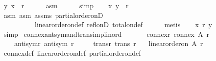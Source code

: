 \begin{isabellebody}
\ {\isachardoublequoteopen}{\isacharparenleft}{\kern0pt}y{\isacharcomma}{\kern0pt}\ x{\isacharparenright}{\kern0pt}\ {\isasymnotin}\ r{\isachardoublequoteclose}\isanewline
\ \ \ \ \isamarkupfalse%
\ asm{}\isanewline
\ \ \ \ \isamarkupfalse%
\ simp\isanewline
\ \ \isamarkupfalse%
\ {\isachardoublequoteopen}{\isacharparenleft}{\kern0pt}x{\isacharcomma}{\kern0pt}\ y{\isacharparenright}{\kern0pt}\ {\isasymin}\ r{\isachardoublequoteclose}\isanewline
\ \ \ \ \isamarkupfalse%
\ asm{}\ asm{}\ assms\ partial{\isacharunderscore}{\kern0pt}order{\isacharunderscore}{\kern0pt}onD{\isacharparenleft}{\kern0pt}{}{\isacharparenright}{\kern0pt}\isanewline
\ \ \ \ \ \ \ \ \ \ linear{\isacharunderscore}{\kern0pt}order{\isacharunderscore}{\kern0pt}on{\isacharunderscore}{\kern0pt}def\ refl{\isacharunderscore}{\kern0pt}onD\ total{\isacharunderscore}{\kern0pt}on{\isacharunderscore}{\kern0pt}def\isanewline
\ \ \ \ \isamarkupfalse%
\ metis\isanewline
\ \ \isamarkupfalse%
\ {\isachardoublequoteopen}x\ {\isasympreceq}\isactrlsub r\ y{\isachardoublequoteclose}\isanewline
\ \ \ \ \isamarkupfalse%
\ simp\isanewline
{}\isamarkupfalse%
%
\endisatagproof
{\isafoldproof}%
%
\isadelimproof
\isanewline
%
\endisadelimproof
\isanewline
{}\isamarkupfalse%
\ connex{\isacharunderscore}{\kern0pt}antsym{\isacharunderscore}{\kern0pt}and{\isacharunderscore}{\kern0pt}trans{\isacharunderscore}{\kern0pt}imp{\isacharunderscore}{\kern0pt}lin{\isacharunderscore}{\kern0pt}ord{\isacharcolon}{\kern0pt}\isanewline
\ \ \isanewline
\ \ \ \ connex{\isacharunderscore}{\kern0pt}r{\isacharcolon}{\kern0pt}\ {\isachardoublequoteopen}connex\ A\ r{\isachardoublequoteclose}\ \isanewline
\ \ \ \ antisym{\isacharunderscore}{\kern0pt}r{\isacharcolon}{\kern0pt}\ {\isachardoublequoteopen}antisym\ r{\isachardoublequoteclose}\ \isanewline
\ \ \ \ trans{\isacharunderscore}{\kern0pt}r{\isacharcolon}{\kern0pt}\ {\isachardoublequoteopen}trans\ r{\isachardoublequoteclose}\isanewline
\ \ \ {\isachardoublequoteopen}linear{\isacharunderscore}{\kern0pt}order{\isacharunderscore}{\kern0pt}on\ A\ r{\isachardoublequoteclose}\isanewline
%
\isadelimproof
\ \ %
\endisadelimproof
%
\isatagproof
{}\isamarkupfalse%
\ connex{\isacharunderscore}{\kern0pt}def\ linear{\isacharunderscore}{\kern0pt}order{\isacharunderscore}{\kern0pt}on{\isacharunderscore}{\kern0pt}def\ partial{\isacharunderscore}{\kern0pt}order{\isacharunderscore}{\kern0pt}on{\isacharunderscore}{\kern0pt}def\isanewline

\end{isabellebody}
